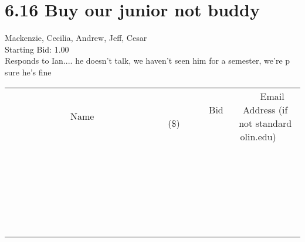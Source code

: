 \documentclass[11pt]{article}
\begin{document}
					\section*{6.16 Buy our junior not buddy}
					Mackenzie, Cecilia, Andrew, Jeff, Cesar \\
					Starting Bid: 1.00 \\
					Responds to Ian.... he doesn't talk, we haven't seen him for a semester, we're p sure he's fine \\
					[6ex]
					\begin{tabular}{c c c}
						~~~~~~~~~~~~~Name~~~~~~~~~~~~~ & ~~~~~~~~~Bid (\$)~~~~~~~~~ & ~~~Email Address (if not standard olin.edu)~~~ \\
				
 & & \\
\hline
 & & \\
\hline
 & & \\
\hline
 & & \\
\hline
 & & \\
\hline
 & & \\
\hline
 & & \\
\hline
 & & \\
\hline
 & & \\
\hline
 & & \\
\hline
 & & \\
\hline
 & & \\
\hline
 & & \\
\hline
 & & \\
\hline
 & & \\
\hline
 & & \\
\hline
 & & \\
\hline
 & & \\
\hline
 & & \\
\hline
 & & \\
\hline
 & & \\
\hline
 & & \\
\hline
 & & \\
\hline
 & & \\
\hline
 & & \\
\hline
 & & \\
\hline
					\end{tabular}
					\clearpage
				
\end{document}
